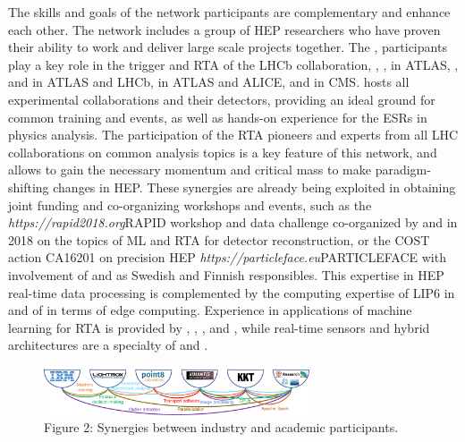 The skills and goals of the network participants are complementary and enhance each other. 
The \acronym network includes a group of HEP researchers who have proven their ability to work and deliver large scale projects together. 
The \dortmundentity, \santiagoentity participants play a key role in the trigger and RTA of the LHCb collaboration, \ohioentity, \pisaentity, \oregonentity in ATLAS, \cnrsentity, \nikhef and \heidelbergentity in ATLAS and LHCb, \lundentity in ATLAS and ALICE, \helsinkientity and \cernentity in CMS.
\cernentity hosts all experimental collaborations and their detectors, providing an ideal ground for common training and events, as well as hands-on experience for the ESRs in physics analysis. 
The participation of the RTA pioneers and experts from all LHC collaborations on common analysis topics is a key feature of this network, and allows to gain the necessary momentum and critical mass to make paradigm-shifting changes in HEP. 
These synergies are already being exploited in obtaining joint funding and co-organizing workshops and events, such as the \textit{https://rapid2018.org}{RAPID workshop} and data challenge co-organized by \dortmundentity and \cnrsentity in 2018 on the topics of ML and RTA for detector reconstruction, or the COST action CA16201 on precision HEP \textit{https://particleface.eu}{PARTICLEFACE} with involvement of \lundentity and \helsinkientity as Swedish and Finnish responsibles. 
This expertise in HEP real-time data processing is complemented by the computing expertise of LIP6 in \cnrsentity and of \fleetmaticsentity in terms of edge computing.  
Experience in applications of machine learning for RTA is provided by \liegesentity, \uniboentity, \ibmentity, \ximantisentity and \pointeightentity, while real-time sensors and hybrid architectures are a specialty of \lightboxentity and \fleetmaticsentity. 

\begin{figure}
	\includegraphics[width=0.7\textwidth]{figs/SMARTHEP_InteractionIndustryAcademia} %
	\caption*{Figure 2: Synergies between industry and academic participants.\label{fig:synergies}}
\end{figure}

